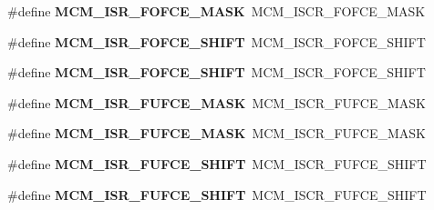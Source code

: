 \begin{DoxyCompactItemize}
\item 
\#define {\bfseries M\+C\+M\+\_\+\+I\+S\+R\+\_\+\+F\+O\+F\+C\+E\+\_\+\+M\+A\+SK}~M\+C\+M\+\_\+\+I\+S\+C\+R\+\_\+\+F\+O\+F\+C\+E\+\_\+\+M\+A\+SK\hypertarget{group__Backward__Compatibility__Symbols_gaad457cfff1c2d9349ece02993cc593a0}{}\label{group__Backward__Compatibility__Symbols_gaad457cfff1c2d9349ece02993cc593a0}

\item 
\#define {\bfseries M\+C\+M\+\_\+\+I\+S\+R\+\_\+\+F\+O\+F\+C\+E\+\_\+\+S\+H\+I\+FT}~M\+C\+M\+\_\+\+I\+S\+C\+R\+\_\+\+F\+O\+F\+C\+E\+\_\+\+S\+H\+I\+FT\hypertarget{group__Backward__Compatibility__Symbols_ga818184249ac03775dce58bbe4c7dbfb7}{}\label{group__Backward__Compatibility__Symbols_ga818184249ac03775dce58bbe4c7dbfb7}

\item 
\#define {\bfseries M\+C\+M\+\_\+\+I\+S\+R\+\_\+\+F\+O\+F\+C\+E\+\_\+\+S\+H\+I\+FT}~M\+C\+M\+\_\+\+I\+S\+C\+R\+\_\+\+F\+O\+F\+C\+E\+\_\+\+S\+H\+I\+FT\hypertarget{group__Backward__Compatibility__Symbols_ga818184249ac03775dce58bbe4c7dbfb7}{}\label{group__Backward__Compatibility__Symbols_ga818184249ac03775dce58bbe4c7dbfb7}

\item 
\#define {\bfseries M\+C\+M\+\_\+\+I\+S\+R\+\_\+\+F\+U\+F\+C\+E\+\_\+\+M\+A\+SK}~M\+C\+M\+\_\+\+I\+S\+C\+R\+\_\+\+F\+U\+F\+C\+E\+\_\+\+M\+A\+SK\hypertarget{group__Backward__Compatibility__Symbols_gad5dd19766af96cb8cdec78954064cfab}{}\label{group__Backward__Compatibility__Symbols_gad5dd19766af96cb8cdec78954064cfab}

\item 
\#define {\bfseries M\+C\+M\+\_\+\+I\+S\+R\+\_\+\+F\+U\+F\+C\+E\+\_\+\+M\+A\+SK}~M\+C\+M\+\_\+\+I\+S\+C\+R\+\_\+\+F\+U\+F\+C\+E\+\_\+\+M\+A\+SK\hypertarget{group__Backward__Compatibility__Symbols_gad5dd19766af96cb8cdec78954064cfab}{}\label{group__Backward__Compatibility__Symbols_gad5dd19766af96cb8cdec78954064cfab}

\item 
\#define {\bfseries M\+C\+M\+\_\+\+I\+S\+R\+\_\+\+F\+U\+F\+C\+E\+\_\+\+S\+H\+I\+FT}~M\+C\+M\+\_\+\+I\+S\+C\+R\+\_\+\+F\+U\+F\+C\+E\+\_\+\+S\+H\+I\+FT\hypertarget{group__Backward__Compatibility__Symbols_ga6dedcd01f8354cf840e86447f16977bc}{}\label{group__Backward__Compatibility__Symbols_ga6dedcd01f8354cf840e86447f16977bc}

\item 
\#define {\bfseries M\+C\+M\+\_\+\+I\+S\+R\+\_\+\+F\+U\+F\+C\+E\+\_\+\+S\+H\+I\+FT}~M\+C\+M\+\_\+\+I\+S\+C\+R\+\_\+\+F\+U\+F\+C\+E\+\_\+\+S\+H\+I\+FT\hypertarget{group__Backward__Compatibility__Symbols_ga6dedcd01f8354cf840e86447f16977bc}{}\label{group__Backward__Compatibility__Symbols_ga6dedcd01f8354cf840e86447f16977bc}


\end{DoxyCompactItemize}
